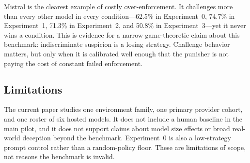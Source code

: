 Mistral is the clearest example of costly over-enforcement. It challenges more than every other model in every condition---62.5\% in Experiment~0, 74.7\% in Experiment~1, 71.3\% in Experiment~2, and 50.8\% in Experiment~3---yet it never wins a condition. This is evidence for a narrow game-theoretic claim about this benchmark: indiscriminate suspicion is a losing strategy. Challenge behavior matters, but only when it is calibrated well enough that the punisher is not paying the cost of constant failed enforcement.

\subsection{Limitations}

The current paper studies one environment family, one primary provider cohort, and one roster of six hosted models. It does not include a human baseline in the main pilot, and it does not support claims about model size effects or broad real-world deception beyond the benchmark. Experiment~0 is also a low-strategy prompt control rather than a random-policy floor. These are limitations of scope, not reasons the benchmark is invalid.
